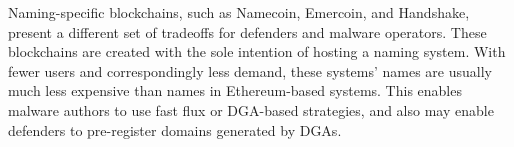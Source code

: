 Naming-specific blockchains, such as Namecoin, Emercoin, and Handshake, 
present a different set of tradeoffs for defenders and malware 
operators. These 
blockchains are created with the sole intention of hosting a naming system. 
With fewer users and correspondingly less demand, these systems' names are 
usually much less expensive than names in Ethereum-based systems. This enables 
malware authors to use fast flux or DGA-based strategies, and also may enable 
defenders to pre-register domains generated by DGAs. 






%
%
%
%
%
%
%
